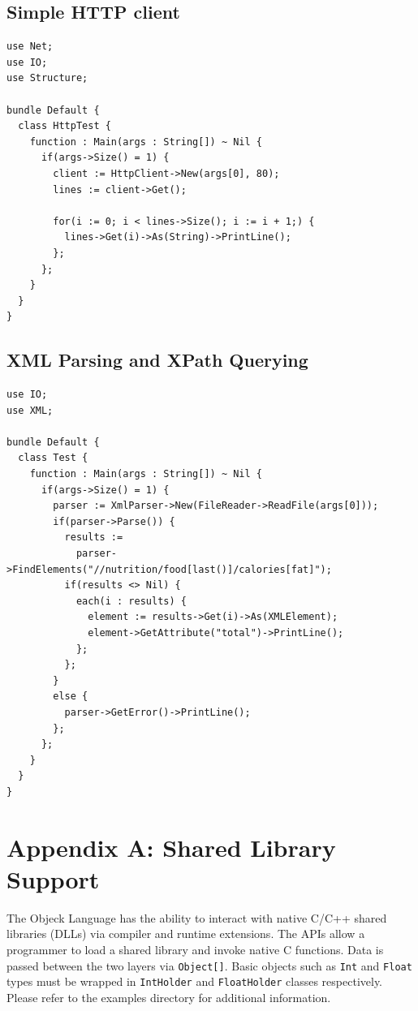 \documentclass[12pt]{article}
\begin{document}
\subsection{Simple HTTP client}
\begin{verbatim}
use Net;
use IO;
use Structure;

bundle Default {
  class HttpTest {
    function : Main(args : String[]) ~ Nil {
      if(args->Size() = 1) {
        client := HttpClient->New(args[0], 80);
        lines := client->Get();

        for(i := 0; i < lines->Size(); i := i + 1;) {
          lines->Get(i)->As(String)->PrintLine();
        };
      };
    }
  }
}
\end{verbatim}

\subsection{XML Parsing and XPath Querying}
\begin{verbatim}
use IO;
use XML;

bundle Default {
  class Test {
    function : Main(args : String[]) ~ Nil {
      if(args->Size() = 1) {
        parser := XmlParser->New(FileReader->ReadFile(args[0]));
        if(parser->Parse()) {
          results := 
            parser->FindElements("//nutrition/food[last()]/calories[fat]");
          if(results <> Nil) {
            each(i : results) {          
              element := results->Get(i)->As(XMLElement);
              element->GetAttribute("total")->PrintLine();
            };
          };
        }
        else {
          parser->GetError()->PrintLine();
        };
      };
    }
  }
}
\end{verbatim}

\newpage

\section{Appendix A: Shared Library Support}
The Objeck Language has the ability to interact with native C/C++ shared libraries (DLLs) via compiler and runtime extensions.  The APIs allow a programmer to load a shared library and invoke native C functions.  Data is passed between the two layers via \texttt{Object[]}.  Basic objects such as \texttt{Int} and \texttt{Float} types must be wrapped in  \texttt{IntHolder} and \texttt{FloatHolder} classes respectively.  Please refer to the examples directory for additional information.
\end{document}
